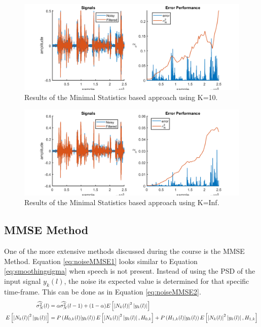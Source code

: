 \begin{figure}[h]
  \centering
  \includegraphics[width=\textwidth]{images/MeanK10.png}
  \caption{Results of the Minimal Statistics based approach using K=10.}
  \label{fig:K10}
\end{figure}

\begin{figure}[h]
  \centering
  \includegraphics[width=\textwidth]{images/MeanKinf.png}
  \caption{Results of the Minimal Statistics based approach using K=Inf.}
  \label{fig:KInf}
\end{figure}

\clearpage
\subsection{MMSE Method}
One of the more extensive methods discussed during the course is the MMSE Method. Equation \ref{eq:noiseMMSE1} looks similar to Equation \ref{eq:smoothingsigma} when speech is not present. Instead of using the PSD of the input signal $y_k(l)$, the noise its expected value is determined for that specific time-frame. This can be done as in Equation \ref{eq:noiseMMSE2}.
\begin{align}
  \widehat{\sigma_{N}^{2}}(l) &= \alpha \widehat{\sigma_{N}^{2}}(l-1) + (1-\alpha)E\left[ \abs{N_{k}(l)}^{2}\abs{y_{k}(l)}\right]
  \label{eq:noiseMMSE1} \\
  E\left[ \abs{N_{k}(l)}^{2}\abs{y_{k}(l)}\right] &=
  P\left(H_{0,k}(l)|y_{k}(l)\right) E\left[\abs{N_{k}(l)}^{2}\abs{y_{k}(l)},H_{0,k}\right] +
  P\left(H_{1,k}(l)|y_{k}(l)\right) E\left[\abs{N_{k}(l)}^{2}\abs{y_{k}(l)},H_{1,k}\right]
  \label{eq:noiseMMSE2}
\end{align}

